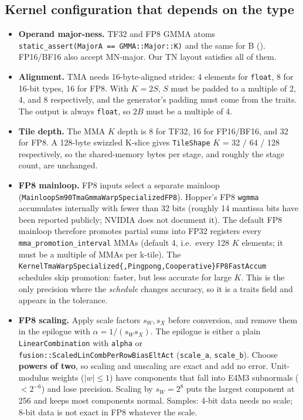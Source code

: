 \documentclass[10pt,letterpaper]{article}
\begin{document}
\subsection*{Kernel configuration that depends on the type}
\begin{itemize}
  \item \textbf{Operand major-ness.} TF32 and FP8 GMMA atoms \texttt{static\_assert(MajorA == GMMA::Major::K)} and the same for B (). FP16/BF16 also accept MN-major. Our TN layout satisfies all of them.
  \item \textbf{Alignment.} TMA needs 16-byte-aligned strides: 4 elements for \texttt{float}, 8 for 16-bit types, 16 for FP8. With $K = 2S$, $S$ must be padded to a multiple of 2, 4, and 8 respectively, and the generator's padding must come from the traits. The output is always \texttt{float}, so $2B$ must be a multiple of 4.
  \item \textbf{Tile depth.} The MMA $K$ depth is 8 for TF32, 16 for FP16/BF16, and 32 for FP8. A 128-byte swizzled K-slice gives \texttt{TileShape} $K$ = 32 / 64 / 128 respectively, so the shared-memory bytes per stage, and roughly the stage count, are unchanged.
  \item \textbf{FP8 mainloop.} FP8 inputs select a separate mainloop (\texttt{MainloopSm90TmaGmmaWarpSpecializedFP8}). Hopper's FP8 \texttt{wgmma} accumulates internally with fewer than 32 bits (roughly 14 mantissa bits have been reported publicly; NVIDIA does not document it). The default FP8 mainloop therefore promotes partial sums into FP32 registers every \texttt{mma\_promotion\_interval} MMAs (default 4, i.e.\ every 128 $K$ elements; it must be a multiple of MMAs per k-tile). The \texttt{KernelTmaWarpSpecialized\{,Pingpong,Cooperative\}FP8FastAccum} schedules skip promotion: faster, but less accurate for large $K$. This is the only precision where the \emph{schedule} changes accuracy, so it is a traits field and appears in the tolerance.
  \item \textbf{FP8 scaling.} Apply scale factors $s_W, s_X$ before conversion, and remove them in the epilogue with $\alpha = 1/(s_W s_X)$. The epilogue is either a plain \texttt{LinearCombination} with \texttt{alpha} or \texttt{fusion::ScaledLinCombPerRowBiasEltAct} (\texttt{scale\_a}, \texttt{scale\_b}). Choose \textbf{powers of two}, so scaling and unscaling are exact and add no error. Unit-modulus weights ($|w| \le 1$) have components that fall into E4M3 subnormals ($< 2^{-6}$) and lose precision. Scaling by $s_W = 2^8$ puts the largest component at 256 and keeps most components normal. Samples: 4-bit data needs no scale; 8-bit data is not exact in FP8 whatever the scale.
\end{itemize}
\end{document}

